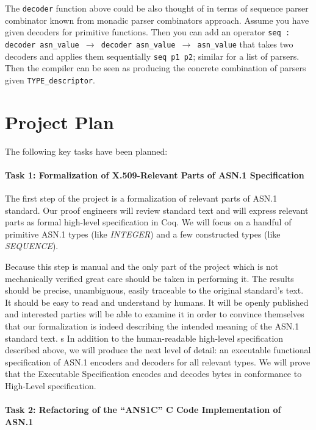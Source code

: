 \documentclass[acmsmall,nonacm]{acmart}
\begin{document}
 The \texttt{decoder} function above could be also thought of in terms
 of sequence parser combinator known from monadic parser combinators
 approach\cite{MPC}. Assume you have given decoders for primitive
 functions. Then you can add an operator \texttt{seq : decoder
   asn\_value $\rightarrow$ decoder asn\_value $\rightarrow$ asn\_value} that takes two
 decoders and applies them sequentially \texttt{seq p1 p2}; similar for a
 list of parsers. Then the compiler can be seen as producing the
 concrete combination of parsers given \texttt{TYPE\_descriptor}.

 \section{Project Plan}
The following key tasks have been planned:
 
\paragraph{Task 1: Formalization of X.509-Relevant Parts of ASN.1 Specification}
The first step of the project is a formalization of relevant parts of ASN.1 standard. Our proof engineers will review standard text and will express relevant parts as formal high-level specification in Coq. We will focus on a handful of primitive ASN.1 types (like \emph{INTEGER}) and a few constructed types (like \emph{SEQUENCE}).

Because this step is manual and the only part of the project which is not mechanically verified great care should be taken in performing it. The results should be precise, unambiguous, easily traceable to the original standard's text. It should be easy to read and understand by humans. It will be openly published and interested parties will be able to examine it in order to convince themselves that our formalization is indeed describing the intended meaning of the ASN.1 standard text.
s
In addition to the human-readable high-level specification described above, we will produce the next level of detail: an executable functional specification of ASN.1 encoders and decoders for all relevant types. We will prove that the Executable Specification encodes and decodes bytes in conformance to High-Level specification.

\paragraph{Task 2: Refactoring of the ``ANS1C'' C Code Implementation of ASN.1}
\end{document}
